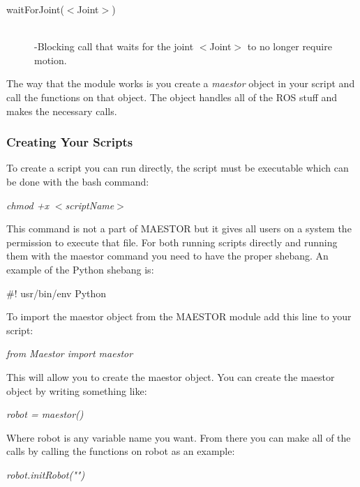 \documentclass[12pt]{article}
\begin{document}
\begin{description}
	\item[waitForJoint($<$Joint$>$)] \hfill \\
	-Blocking call that waits for the joint $<$Joint$>$ to no longer require motion.
\end{description}

\noindent The way that the module works is you create a \textit{maestor} object in your script and call the functions on that object. The object handles all of the ROS stuff and makes the necessary calls. 

\subsubsection{Creating Your Scripts}

To create a script you can run directly, the script must be executable which can be done with the bash command:

\begin{center}
	\textit{chmod +x $<$scriptName$>$}
\end{center}

This command is not a part of MAESTOR but it gives all users on a system the permission to execute that file. For both running scripts directly and running them with the maestor command you need to have the proper shebang. An example of the Python shebang is:

\begin{center}
	\#! usr/bin/env Python
\end{center} 

To import the maestor object from the MAESTOR module add this line to your script:

\begin{center}
	\textit{from Maestor import maestor}
\end{center}

This will allow you to create the maestor object. You can create the maestor object by writing something like: 

\begin{center}
	\textit{robot = maestor()}
\end{center}

Where robot is any variable name you want. From there you can make all of the calls by calling the functions on robot as an example:

\begin{center}
	\textit{robot.initRobot("")}
\end{center}
\end{document}
